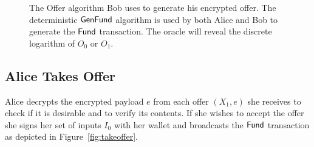 \documentclass[runningheads]{llncs}
\begin{document}
\begin{figure}[!h]
  \centering
 \caption{The \textsf{Offer} algorithm Bob uses to generate his encrypted offer. The deterministic $\textsf{GenFund}$ algorithm is used by both Alice and Bob to generate the $\textsf{Fund}$ transaction. The oracle will reveal the discrete logarithm of $O_0$ or $O_1$.}\label{fig:offer-alg}
\end{figure}

\subsection{Alice Takes Offer}

Alice decrypts the encrypted payload $e$ from each offer $(X_1, e)$ she receives to check if it is desirable and to verify its contents. If she wishes to accept the offer she signs her set of inputs $I_0$ with her wallet and broadcasts the $\textsf{Fund}$ transaction as depicted in Figure~\ref{fig:takeoffer}.
\end{document}
